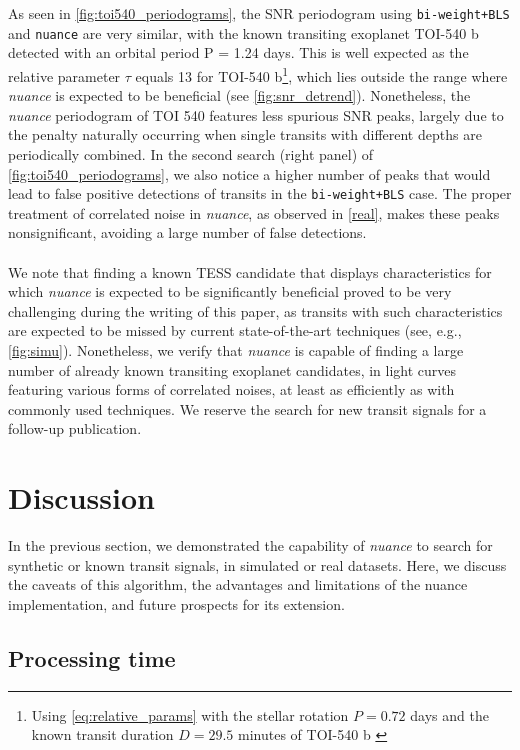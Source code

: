 \documentclass[modern,linenumbers]{aastex631}
\newcommand{\nuancemethod}{\textit{nuance}}
\newcommand{\nuance}{\nuancemethod{}}
\newcommand{\nuancecode}{\textsf{nuance}}
\newcommand{\review}[1]{#1}
\begin{document}
As seen in \autoref{fig:toi540_periodograms}, the SNR periodogram using \texttt{bi-weight+BLS} and \texttt{nuance} are very similar, with the known transiting exoplanet TOI-540 b detected with an orbital period P = 1.24 days. This is well expected as the relative parameter $\tau$ equals 13 for TOI-540 b\footnote{Using \autoref{eq:relative_params} with the stellar rotation $P=0.72$ days and the known transit duration $D=29.5$ minutes of TOI-540 b \citep{TOI540}}, which lies outside the range where \nuancemethod{} is expected to be beneficial (see \autoref{fig:snr_detrend}). \review{Nonetheless}, the \nuance{} periodogram of TOI 540 features less spurious SNR peaks, largely due to the penalty naturally occurring when single transits with different depths are periodically combined. In the second search (right panel) of \autoref{fig:toi540_periodograms}, we also notice a higher number of peaks that would lead to false positive detections of transits in the \texttt{bi-weight+BLS} case. The proper treatment of correlated noise in \nuance{}, as observed in \autoref{real}, makes these peaks nonsignificant, avoiding a large number of false detections.\\\\
We note that finding a known TESS candidate that displays characteristics for which \nuance{} is expected to be significantly beneficial proved to be very challenging during the writing of this paper, as transits with such characteristics are expected to be missed by current state-of-the-art techniques (see, e.g., \autoref{fig:simu}). Nonetheless, we verify that \nuancemethod{} is capable of finding a large number of already known transiting exoplanet candidates, in light curves featuring various forms of correlated noises, at least as efficiently as with commonly used techniques. We reserve the search for new transit signals for a follow-up publication.

\newpage
\section{Discussion}\label{discussion}

In the previous section, we demonstrated the capability of \nuance{} to search for synthetic or known transit signals, in simulated or real datasets. Here, we discuss the caveats of this algorithm, the advantages and limitations of the \nuancecode{} implementation, and future prospects for its extension.

\subsection{Processing time}
\end{document}
